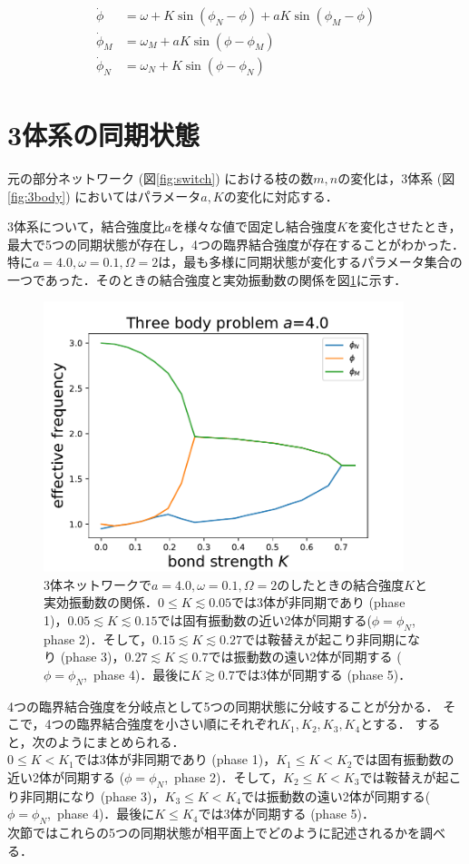 \documentclass[../main]{subfiles}
\begin{document}
\begin{align}
    \label{eq:3body}
    \begin{split}
        \dot{\phi}&=\omega+K\sin\left( \phi_N-\phi \right)+aK\sin\left( \phi_M-\phi \right)\\
        \dot{\phi}_M&=\omega_M+aK\sin\left( \phi-\phi_M \right) \\
        \dot{\phi}_N&=\omega_N+K\sin\left( \phi-\phi_N \right)    
    \end{split}
\end{align}
\section{3体系の同期状態}
元の部分ネットワーク (図\ref{fig:switch}) における枝の数$m,n$の変化は，3体系 (図\ref{fig:3body}) においてはパラメータ$a,K$の変化に対応する．

3体系について，結合強度比$a$を様々な値で固定し結合強度$K$を変化させたとき，最大で5つの同期状態が存在し，4つの臨界結合強度が存在することがわかった．
特に$a=4.0,\omega=0.1,\Omega=2$は，最も多様に同期状態が変化するパラメータ集合の一つであった．そのときの結合強度と実効振動数の関係を図\ref{fig:3body-state}に示す．
\begin{figure}[t]
\centering
\includegraphics[width=105mm]{./images/three-body-prob.pdf}
\centering
\caption{3体ネットワークで$a=4.0,\omega=0.1,\Omega=2$のしたときの結合強度$K$と実効振動数の関係．$0\leq K\lesssim 0.05$では3体が非同期であり (phase 1)，$0.05\lesssim K\lesssim 0.15$では固有振動数の近い2体が同期する($\phi=\phi_N$, phase 2)．そして，$0.15 \lesssim K\lesssim 0.27$では鞍替えが起こり非同期になり (phase 3)，$0.27\lesssim K\lesssim 0.7$では振動数の遠い2体が同期する ($\phi=\phi_N$,\ phase 4)．最後に$K\gtrsim 0.7$では3体が同期する (phase 5)．}
\label{fig:3body-state}
\end{figure}
4つの臨界結合強度を分岐点として5つの同期状態に分岐することが分かる．
そこで，4つの臨界結合強度を小さい順にそれぞれ$K_1,K_2,K_3,K_4$とする．
すると，次のようにまとめられる．\\
$0\leq K<K_1$では3体が非同期であり (phase 1)，$K_1\leq K<K_2$では固有振動数の近い2体が同期する ($\phi=\phi_N$,\ phase 2)．そして，$K_2\leq K<K_3$では鞍替えが起こり非同期になり (phase 3)，$K_3\leq K<K_4$では振動数の遠い2体が同期する($\phi=\phi_N$,\ phase 4)．最後に$K\leq K_4$では3体が同期する (phase 5)．\\
次節ではこれらの5つの同期状態が相平面上でどのように記述されるかを調べる．
\end{document}
